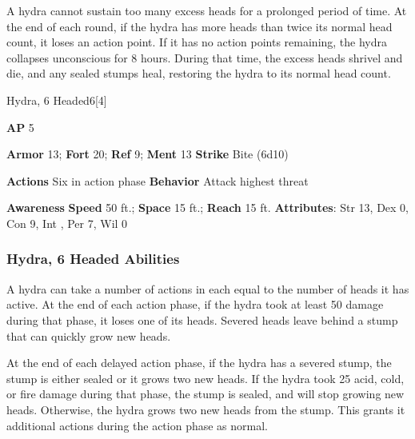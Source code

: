 A hydra cannot sustain too many excess heads for a prolonged period of time.
At the end of each round, if the hydra has more heads than twice its normal head count, it loses an action point.
If it has no action points remaining, the hydra collapses unconscious for 8 hours.
During that time, the excess heads shrivel and die, and any sealed stumps heal, restoring the hydra to its normal head count.

\begin{monsection}{Hydra, 6 Headed}{6}[4]
\vspace{-1em}\vspace{-1em}
\begin{spellcontent}
\begin{spelltargetinginfo}
{\textbf{AP} 5}

\pari \textbf{Armor} 13;
\textbf{Fort} 20;
\textbf{Ref} 9;
\textbf{Ment} 13
\pari \textbf{Strike} Bite  (6d10)


\pari \textbf{Actions} Six in action phase
\pari \textbf{Behavior} Attack highest threat
\end{spelltargetinginfo}
\end{spellcontent}

\begin{monsterfooter}
\pari \textbf{Awareness} 
\pari \textbf{Speed} 50 ft.;
\textbf{Space} 15 ft.;
\textbf{Reach} 15 ft.
\pari \textbf{Attributes}:
Str 13,
Dex 0,
Con 9,
Int ,
Per 7,
Wil 0
\end{monsterfooter}
\end{monsection}


\subsubsection{Hydra, 6 Headed Abilities}

A hydra can take a number of actions in each  equal to the number of heads it has active.
At the end of each action phase, if the hydra took at least 50 damage during that phase, it loses one of its heads.
Severed heads leave behind a stump that can quickly grow new heads.

At the end of each delayed action phase, if the hydra has a severed stump, the stump is either sealed or it grows two new heads.
If the hydra took 25 acid, cold, or fire damage during that phase, the stump is sealed, and will stop growing new heads.
Otherwise, the hydra grows two new heads from the stump.
This grants it additional actions during the action phase as normal.

